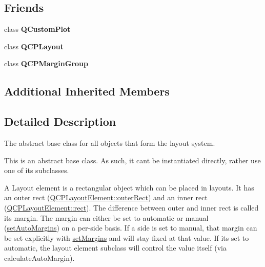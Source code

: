 \subsection*{Friends}
\begin{DoxyCompactItemize}
\item 
\mbox{\label{classQCPLayoutElement_a1cdf9df76adcfae45261690aa0ca2198}} 
class {\bfseries Q\+Custom\+Plot}
\item 
\mbox{\label{classQCPLayoutElement_a588aac0a0d721f6c5f10126d8596a20f}} 
class {\bfseries Q\+C\+P\+Layout}
\item 
\mbox{\label{classQCPLayoutElement_ad077a686e85ab6fa03dcb2fd37fc499a}} 
class {\bfseries Q\+C\+P\+Margin\+Group}
\end{DoxyCompactItemize}
\subsection*{Additional Inherited Members}


\subsection{Detailed Description}
The abstract base class for all objects that form the layout system. 

This is an abstract base class. As such, it can\textquotesingle{}t be instantiated directly, rather use one of its subclasses.

A Layout element is a rectangular object which can be placed in layouts. It has an outer rect (\hyperlink{classQCPLayoutElement_a2a32a12a6161c9dffbadeb9cc585510c}{Q\+C\+P\+Layout\+Element\+::outer\+Rect}) and an inner rect (\hyperlink{classQCPLayoutElement_a208effccfe2cca4a0eaf9393e60f2dd4}{Q\+C\+P\+Layout\+Element\+::rect}). The difference between outer and inner rect is called its margin. The margin can either be set to automatic or manual (\hyperlink{classQCPLayoutElement_accfda49994e3e6d51ed14504abf9d27d}{set\+Auto\+Margins}) on a per-\/side basis. If a side is set to manual, that margin can be set explicitly with \hyperlink{classQCPLayoutElement_a8f450b1f3f992ad576fce2c63d8b79cf}{set\+Margins} and will stay fixed at that value. If it\textquotesingle{}s set to automatic, the layout element subclass will control the value itself (via calculate\+Auto\+Margin).

